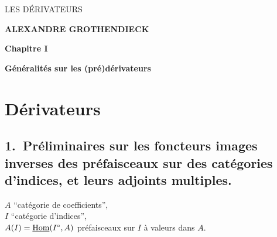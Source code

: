 \dgrchunkbegin

\printedpage{--} %

\begin{center}
{\Large\textsf{LES DÉRIVATEURS}}

\bigskip

\textbf{ALEXANDRE GROTHENDIECK}

\bigskip\bigskip

\textbf{Chapitre I}

\medskip

\textbf{Généralités sur les (pré)dérivateurs}
\end{center}

\vfill



\clearpage

\printedpage{--} %


\clearpage



\section*{Dérivateurs}

\subsection*{\textmd{1.}\ Préliminaires sur les foncteurs images inverses des préfaisceaux sur des catégories d'indices, et leurs adjoints multiples.}

$A$ “catégorie de coefficients”,\\
$I$ “catégorie d'indices”,\\
$A(I)=\underline{\operatorname{Hom}}(I^{\circ},A)$ préfaisceaux sur $I$ à valeurs dans $A$.

